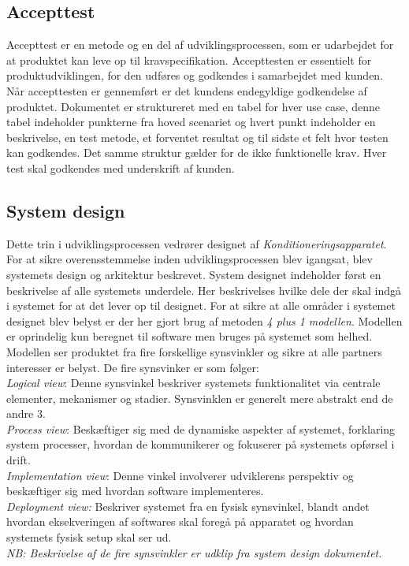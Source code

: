 	\subsection{Accepttest} \label{title:accepttest}
	Accepttest er en metode og en del af udviklingsprocessen, som er udarbejdet for at produktet kan leve op til kravspecifikation. Accepttesten er essentielt for produktudviklingen, for den udføres og godkendes i samarbejdet med kunden. Når accepttesten er gennemført er det kundens endegyldige godkendelse af produktet. 
	Dokumentet er struktureret med en tabel for hver use case, denne tabel indeholder punkterne fra hoved scenariet og hvert punkt indeholder en beskrivelse, en test metode, et forventet resultat og til sidste et felt hvor testen kan godkendes. Det samme struktur gælder for de ikke funktionelle krav. Hver test skal godkendes med underskrift af kunden.
	
	\subsection{System design} \label{title:systemdesign}
	Dette trin i udviklingsprocessen vedrører designet af \textit{Konditioneringsapparatet}. For at sikre overensstemmelse inden udviklingsprocessen blev igangsat, blev systemets design og arkitektur beskrevet. System designet indeholder først en beskrivelse af alle systemets underdele. Her beskrivelses hvilke dele der skal indgå i systemet for at det lever op til designet.
	For at sikre at alle områder i systemet designet blev belyst er der her gjort brug af metoden \textit{4 plus 1 modellen}. Modellen er oprindelig kun beregnet til software men bruges på systemet som helhed. Modellen ser produktet fra fire forskellige synsvinkler og sikre at alle partners interesser er belyst. De fire synsvinker er som følger: 
	\\ \textit{Logical view}: Denne synsvinkel beskriver systemets funktionalitet via centrale elementer, mekanismer og stadier. Synsvinklen er generelt mere abstrakt end de andre 3. \\
	\textit{Process view}: Beskæftiger sig med de dynamiske aspekter af systemet, forklaring system processer, hvordan de kommunikerer og fokuserer på systemets opførsel i drift. \\
	\textit{Implementation view}: Denne vinkel involverer udviklerens perspektiv og beskæftiger sig med hvordan software implementeres. \\
	\textit{Deployment view:} Beskriver systemet fra en fysisk synsvinkel, blandt andet hvordan eksekveringen af softwares skal foregå på apparatet og hvordan systemets fysisk setup skal ser ud. \\
	\textit{NB: Beskrivelse af de fire synsvinkler er udklip fra system design dokumentet.} 
	
